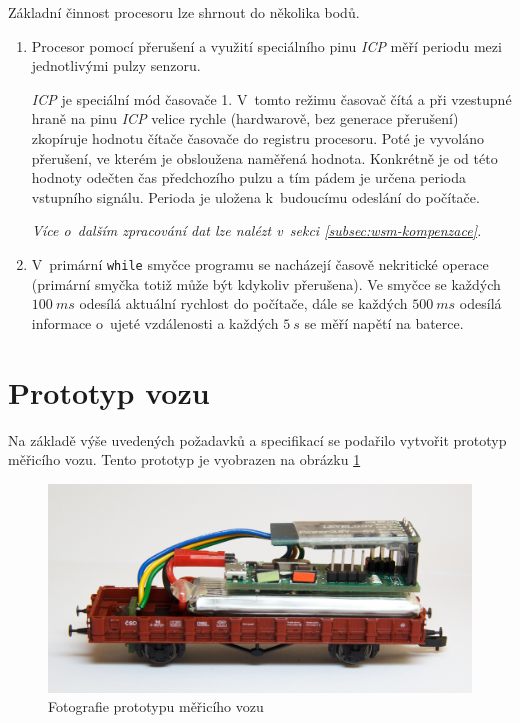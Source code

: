 Základní činnost procesoru lze shrnout do několika bodů.

\begin{enumerate}
\item Procesor pomocí přerušení a využití speciálního pinu \textit{ICP}
měří periodu mezi jednotlivými pulzy senzoru.

\textit{ICP} je speciální mód časovače 1. V~tomto režimu časovač čítá a při
vzestupné hraně na pinu \textit{ICP} velice rychle (hardwarově, bez generace
přerušení) zkopíruje hodnotu čítače časovače do registru procesoru. Poté je
vyvoláno přerušení, ve kterém je obsloužena naměřená hodnota. Konkrétně je od
této hodnoty odečten čas předchozího pulzu a tím pádem je určena perioda
vstupního signálu. Perioda je uložena k~budoucímu odeslání do počítače.

\textit{Více o~dalším zpracování dat lze nalézt v~sekci
\ref{subsec:wsm-kompenzace}.}

\item V~primární \texttt{while} smyčce programu se nacházejí časově nekritické
operace (primární smyčka totiž může být kdykoliv přerušena). Ve
smyčce se každých $100\ ms$ odesílá aktuální rychlost do počítače, dále se každých
$500\ ms$ odesílá informace o~ujeté vzdálenosti a každých $5\ s$ se měří napětí
na baterce.

\end{enumerate}

\section{Prototyp vozu}
\label{sec:wsm-prototype}

Na základě výše uvedených požadavků a specifikací se podařilo vytvořit prototyp
měřicího vozu. Tento prototyp je vyobrazen na obrázku \ref{fig:vuz-photo}

\begin{figure}[h]
\includegraphics[width=\textwidth]{data/wsm_3d.jpg}
\caption{Fotografie prototypu měřicího vozu}
\label{fig:vuz-photo}
\end{figure}

